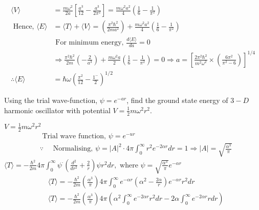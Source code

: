\begin{enumerate}
\begin{answer}
\begin{align*}
\langle V\rangle&=\frac{m \omega^{2}}{2 a}\left[\frac{a^{3}}{12}-\frac{a^{3}}{2 \pi^{2}}\right]=\frac{m \omega^{2} a^{2}}{4}\left(\frac{1}{6}-\frac{1}{\pi^{2}}\right)\\
\text { Hence, }\langle E\rangle&=\langle T\rangle+\langle V\rangle=\left(\frac{\pi^{2} \hbar^{2}}{2 m a^{2}}\right)+\frac{m \omega^{2} a^{2}}{4}\left(\frac{1}{6}-\frac{1}{\pi^{2}}\right)\\
&\text { For minimum energy, } \frac{d\langle E\rangle}{d a}=0\\
&\Rightarrow \frac{\pi^{2} \hbar^{2}}{2 m}\left(-\frac{2}{a^{3}}\right)+\frac{m \omega^{2} a}{2}\left(\frac{1}{6}-\frac{1}{\pi^{2}}\right)=0 \Rightarrow a=\left[\frac{2 \pi^{2} \hbar^{2}}{m^{2} \omega^{2}} \times\left(\frac{6 \pi^{2}}{\pi^{2}-6}\right)\right]^{1 / 4} \\
\therefore\langle E\rangle&=\hbar \omega\left(\frac{\pi^{2}}{12}-\frac{1^{-}}{2}\right)^{1 / 2}
\end{align*}
\end{answer}
	\begin{minipage}{\textwidth}
	\item Using the trial wave-function, $\psi=e^{-a r}$, find the ground state energy of $3-D$ harmonic oscillator with potential $V=\frac{1}{2} m \omega^{2} r^{2}$.
\end{minipage}
\begin{answer}
	$V=\frac{1}{2} m \omega^{2} r^{2}$\\
	\begin{align*}
		&\text { Trial wave function, } \psi=e^{-u r} \\
		&\because \quad \text { Normalising, } \psi=|A|^{2} \cdot 4 \pi \int_{0}^{\infty} r^{2} e^{-2 \alpha r} d r=1 \Rightarrow|A|=\sqrt{\frac{\alpha^{3}}{\pi}}
	\end{align*}
	$\langle T\rangle=-\frac{\hbar^{2}}{2 m} 4 \pi \int_{0}^{\infty} \psi^{\cdot}\left(\frac{d^{2}}{d r^{2}}+\frac{2}{r}\right) \psi r^{2} d r, \text { where } \psi=\sqrt{\frac{\alpha^{3}}{\pi}} e^{-\alpha r}$\\
	\begin{align*}
		&\langle T\rangle=-\frac{\hbar^{2}}{2 m}\left(\frac{\alpha^{3}}{\pi}\right) 4 \pi \int_{0}^{\infty} e^{-\alpha r}\left(\alpha^{2}-\frac{2 \alpha}{r}\right) e^{-\alpha r} r^{2} d r \\
		&\langle T\rangle=-\frac{\hbar^{2}}{2 m}\left(\frac{\alpha^{3}}{\pi}\right) 4 \pi\left(\alpha^{2} \int_{0}^{\infty} e^{-2 \alpha r} r^{2} d r-2 \alpha \int_{0}^{\infty} e^{-2 \alpha r} r d r\right) \\

\end{align*}
\end{answer}
\end{enumerate}
